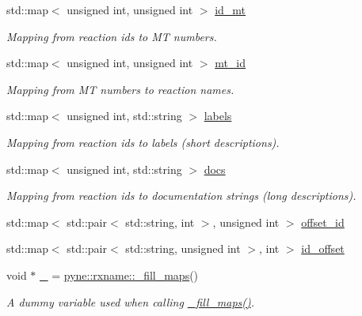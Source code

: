 \begin{DoxyCompactItemize}
\mbox{\label{namespacepyne_1_1rxname_a94ff01a63e221db69f259fa48616d3d5}} 
std\+::map$<$ unsigned int, unsigned int $>$ \hyperlink{namespacepyne_1_1rxname_a94ff01a63e221db69f259fa48616d3d5}{id\+\_\+mt}
\begin{DoxyCompactList}\small\item\em Mapping from reaction ids to MT numbers. \end{DoxyCompactList}\item 
\mbox{\label{namespacepyne_1_1rxname_aca6dede953b1e7c1400ea23d40dce88c}} 
std\+::map$<$ unsigned int, unsigned int $>$ \hyperlink{namespacepyne_1_1rxname_aca6dede953b1e7c1400ea23d40dce88c}{mt\+\_\+id}
\begin{DoxyCompactList}\small\item\em Mapping from MT numbers to reaction names. \end{DoxyCompactList}\item 
\mbox{\label{namespacepyne_1_1rxname_a17fd6738dc8fcc8d08f3496926738364}} 
std\+::map$<$ unsigned int, std\+::string $>$ \hyperlink{namespacepyne_1_1rxname_a17fd6738dc8fcc8d08f3496926738364}{labels}
\begin{DoxyCompactList}\small\item\em Mapping from reaction ids to labels (short descriptions). \end{DoxyCompactList}\item 
\mbox{\label{namespacepyne_1_1rxname_a1fcbb2b6dcf86e49cc70c4dfabf409ef}} 
std\+::map$<$ unsigned int, std\+::string $>$ \hyperlink{namespacepyne_1_1rxname_a1fcbb2b6dcf86e49cc70c4dfabf409ef}{docs}
\begin{DoxyCompactList}\small\item\em Mapping from reaction ids to documentation strings (long descriptions). \end{DoxyCompactList}\item 
std\+::map$<$ std\+::pair$<$ std\+::string, int $>$, unsigned int $>$ \hyperlink{namespacepyne_1_1rxname_a699be84310dad599582278e04135326e}{offset\+\_\+id}
\item 
std\+::map$<$ std\+::pair$<$ std\+::string, unsigned int $>$, int $>$ \hyperlink{namespacepyne_1_1rxname_ae2f5760c11dc39df3f90fbcc6584c95c}{id\+\_\+offset}
\item 
\mbox{\label{namespacepyne_1_1rxname_ac59f8c4154e812420e0dfef0388a592b}} 
void $\ast$ \hyperlink{namespacepyne_1_1rxname_ac59f8c4154e812420e0dfef0388a592b}{\+\_\+} = \hyperlink{namespacepyne_1_1rxname_a4f97a2c91bfc51caf1e34eb21ed6c290}{pyne\+::rxname\+::\+\_\+fill\+\_\+maps}()
\begin{DoxyCompactList}\small\item\em A dummy variable used when calling \hyperlink{namespacepyne_1_1rxname_a4f97a2c91bfc51caf1e34eb21ed6c290}{\+\_\+fill\+\_\+maps()}. \end{DoxyCompactList}\end{DoxyCompactItemize}


